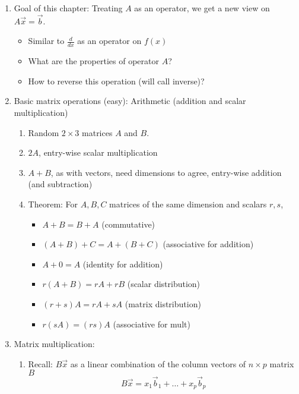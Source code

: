 \documentclass{article}
\begin{document}
\begin{enumerate}


\item Goal of this chapter: Treating $A$ as an operator, we get a new view on $A\vec{x} = \vec{b}$. 
\begin{itemize}
\item Similar to $\frac{d}{dx}$ as an operator on $f(x)$
\item What are the properties of operator $A$?
\item How to reverse this operation (will call inverse)? 
\end{itemize}

\item Basic matrix operations (easy): Arithmetic (addition and scalar multiplication)
\begin{enumerate}
\item Random $2 \times 3$ matrices $A$ and $B$. 
\item $2A$, entry-wise scalar multiplication
\item $A+B$, as with vectors, need dimensions to agree, entry-wise addition (and subtraction)
\item Theorem: For $A, B, C$ matrices of the same dimension and scalars $r, s$, 
\begin{itemize}
\item $A+B = B+A$ (commutative)
\item $(A+B)+C = A+(B+C)$ (associative for addition)
\item $A+0 = A$ (identity for addition)
\item $r(A+B) = rA+rB$ (scalar distribution)
\item $(r+s)A = rA+sA$ (matrix distribution)
\item $r(sA) = (rs)A$ (associative for mult)
\end{itemize}
\end{enumerate}

\item Matrix multiplication:
\begin{enumerate}
\item Recall: $B \vec{x}$ as a linear combination of the column vectors of $n \times p$ matrix $B$
\[
B \vec{x} = x_1 \vec{b}_1 + \dots + x_p \vec{b}_p
\]


\end{enumerate}
\end{enumerate}
\end{document}
